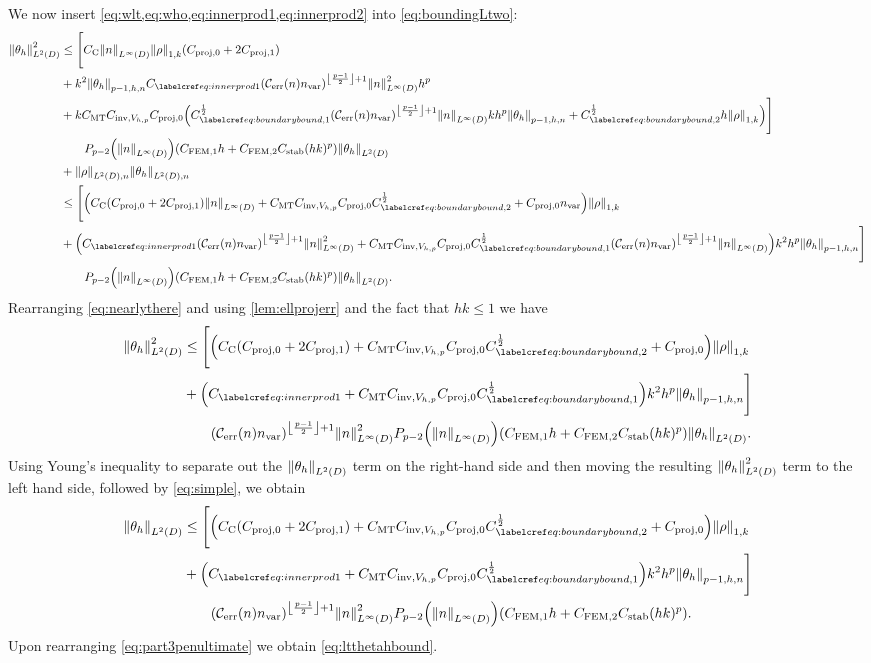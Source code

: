 We now insert \cref{eq:wlt,eq:who,eq:innerprod1,eq:innerprod2} into \cref{eq:boundingLtwo}:
\begin{align}
\NLtD{\thetah}^2 &\leq \Bigg[\Cc\NLiD{n} \NW{\rho} \mleft(\Cprojfn{0} + 2\Cprojfn{1}\mright)\\
&+k^2\Nfn{p-1,h,n}{\thetah}  \Cfourteen \mleft(\En \nvar\mright)^{\floor{\frac{p-1}2}+1}\NLiD{n}^2 h^p \\
&+k\CMT \CinvVhp \Cprojfn{0} \mleft(\Cboundaryo^{\half} \mleft(\En\nvar\mright)^{\floor{\frac{p-1}2}+1}\NLiD{n} k h^{p} \Nfn{p-1,h,n}{\thetah} + \Cboundaryt^{\half} h \NW{\rho}\mright)\Bigg]\nonumber\\
&\quad\quad \Pfn{p-2}\mleft(\NLiD{n}\mright)\mleft(\CFEMotilde h + \CFEMttilde \CAnk (hk)^p\mright)\NLtD{\thetah}\\
&+\NLtDn{\rho}\NLtDn{\thetah}\nonumber\\
&\leq \Bigg[\mleft(\Cc\mleft(\Cprojfn{0} + 2\Cprojfn{1}\mright)\NLiD{n} + \CMT \CinvVhp \Cprojfn{0} \Cboundaryt^{\half} + \Cprojfn{0}\nvar  \mright)\NW{\rho} \\
&+\mleft(  \Cfourteen \mleft(\En \nvar\mright)^{\floor{\frac{p-1}2}+1}\NLiD{n}^2 + \CMT \CinvVhp \Cprojfn{0}\Cboundaryo^{\half} \mleft(\En\nvar\mright)^{\floor{\frac{p-1}2}+1}\NLiD{n}\mright)k^2h^p\Nfn{p-1,h,n}{\thetah}\Bigg]\nonumber\\
&\quad\quad \Pfn{p-2}\mleft(\NLiD{n}\mright)\mleft(\CFEMotilde h + \CFEMttilde \CAnk (hk)^p\mright)\NLtD{\thetah}.\label{eq:nearlythere}
\end{align}
Rearranging \cref{eq:nearlythere} and using \cref{lem:ellprojerr} and the fact that $hk \leq 1$ we have
  \begin{align*}
\NLtD{\thetah}^2&\leq \Bigg[\mleft(\Cc\mleft(\Cprojfn{0} + 2\Cprojfn{1}\mright) + \CMT \CinvVhp \Cprojfn{0} \Cboundaryt^{\half} + \Cprojfn{0}  \mright)\NW{\rho} \nonumber\\
&+\mleft(  \Cfourteen  + \CMT \CinvVhp \Cprojfn{0}\Cboundaryo^{\half} \mright)k^2h^p\Nfn{p-1,h,n}{\thetah}\Bigg]\nonumber\\
&\quad\quad \mleft(\En \nvar\mright)^{\floor{\frac{p-1}2}+1}\NLiD{n}^2\Pfn{p-2}\mleft(\NLiD{n}\mright)\mleft(\CFEMotilde h + \CFEMttilde \CAnk (hk)^p\mright)\NLtD{\thetah}.
\end{align*}
  Using Young's inequality to separate out the $\NLtD{\thetah}$ term on the right-hand side and then moving the resulting $\NLtD{\thetah}^2$ term to the left hand side, followed by \cref{eq:simple}, we obtain
\begin{align}
\NLtD{\thetah}&\leq \Bigg[\mleft(\Cc\mleft(\Cprojfn{0} + 2\Cprojfn{1}\mright) + \CMT \CinvVhp \Cprojfn{0} \Cboundaryt^{\half} + \Cprojfn{0}  \mright)\NW{\rho}\nonumber \\
&+\mleft(  \Cfourteen  + \CMT \CinvVhp \Cprojfn{0}\Cboundaryo^{\half} \mright)k^2h^p\Nfn{p-1,h,n}{\thetah}\Bigg]\nonumber\\
&\quad\quad \mleft(\En \nvar\mright)^{\floor{\frac{p-1}2}+1}\NLiD{n}^2\Pfn{p-2}\mleft(\NLiD{n}\mright)\mleft(\CFEMotilde h + \CFEMttilde \CAnk (hk)^p\mright)\label{eq:part3penultimate}.
\end{align}
Upon rearranging \cref{eq:part3penultimate} we obtain \cref{eq:ltthetahbound}.

